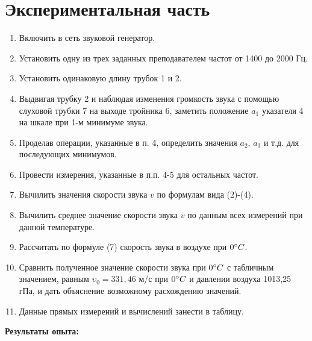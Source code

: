 \documentclass[12pt]{article}
\newcommand\field[1]{\noindent\textbf{#1}\ }
\begin{document}
\section*{Экспериментальная часть}
\begin{enumerate}
    \item Включить в сеть звуковой генератор.
    \item Установить одну из трех заданных преподавателем частот от 1400 до 2000 Гц.
    \item Установить одинаковую длину трубок 1 и 2.
    \item Выдвигая трубку 2 и наблюдая изменения громкость звука с помощью слуховой трубки 7 на выходе тройника 6, заметить положение $a_1$ указателя 4 на шкале при 1-м минимуме звука.
    \item Проделав операции, указанные в п. 4, определить значения $a_2$, $a_3$ и т.д. для последующих минимумов.
    \item Провести измерения, указанные в п.п. 4-5 для остальных частот.
    \item Вычилить значения скорости звука $\overline{v}$ по формулам вида (2)-(4).
    \item Вычилить среднее значение скорости звука $\overline{v}$ по данным всех измерений при данной температуре.
    \item Рассчитать по формуле (7) скорость звука в воздухе при $0 \degree C$.
    \item Сравнить полученное значение скорости звука при $0 \degree C$ с табличным значением, равным $\upsilon_0 = 331,46$ м/с при  $0 \degree C$ и давлении воздуха 1013,25 гПа, и дать объяснение возможному расхождению значений.
    \item Данные прямых измерений и вычислений занести в таблицу.
\end{enumerate}

\field{Результаты опыта:}
\end{document}
